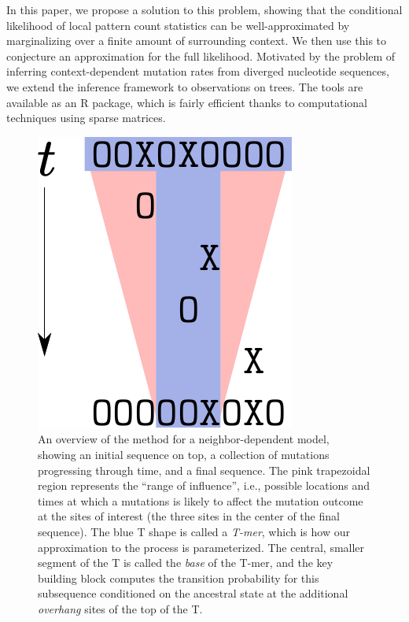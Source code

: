 \documentclass{article}
\theoremstyle{plain}
\theoremstyle{definition}
\begin{document}
In this paper, we propose a solution to this problem,
showing that the conditional likelihood of local pattern count statistics
can be well-approximated by marginalizing over a finite amount of surrounding context.
We then use this to conjecture an approximation for the full likelihood.
Motivated by the problem of inferring context-dependent mutation rates from diverged nucleotide sequences,
we extend the inference framework to observations on trees.
The tools are available as an R package,
which is fairly efficient thanks to
computational techniques using sparse matrices.

\begin{figure}
    \begin{center}
        \includegraphics{overview}
    \end{center}
    \caption{
        An overview of the method for a neighbor-dependent model, showing an
        initial sequence on top, a collection of mutations progressing through
        time, and a final sequence.
        The pink trapezoidal region represents the ``range of influence'',
        i.e., possible locations and times at which a mutations is likely
        to affect the mutation outcome at
        the sites of interest (the three sites in the center of the final sequence).
        The blue T shape is called a \emph{T-mer},
        which is how our approximation to the process is parameterized.
        The central, smaller segment of the T is called the \emph{base} of the T-mer,
        and the key building block computes the transition probability
        for this subsequence
        conditioned on the ancestral state at the additional \emph{overhang}
        sites of the top of the T.
        \label{fig:overview}
    }
\end{figure}
\end{document}
